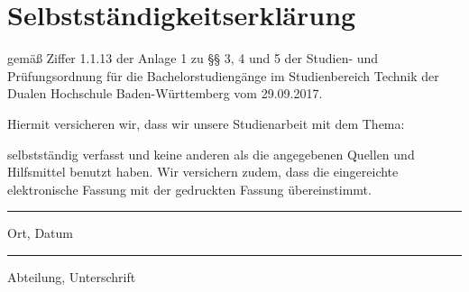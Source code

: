 \section*{\Huge{Selbstständigkeitserklärung}}
gemäß Ziffer 1.1.13 der Anlage 1 zu §§ 3, 4 und 5  der Studien- und Prüfungsordnung für die Bachelorstudiengänge im Studienbereich Technik der Dualen Hochschule Baden-Würt­tem­berg vom 29.09.2017.

\noindent Hiermit versicheren wir, dass wir unsere Studienarbeit mit dem Thema: 
\begin{center}
	\Large\textbf{\vTitel}
\end{center}
selbstständig verfasst und keine anderen als die angegebenen Quellen und Hilfsmittel benutzt haben. Wir versichern zudem, dass die eingereichte elektronische Fassung mit der gedruckten Fassung übereinstimmt.

\vfill
\leavevmode
\newline
\parbox{6cm}{\hrule\strut\centering\footnotesize Ort, Datum} 
\hfill
\parbox{6cm}{\hspace{1pt} \vAbteilung\hrule\strut\centering\footnotesize Abteilung, Unterschrift}

\newpage